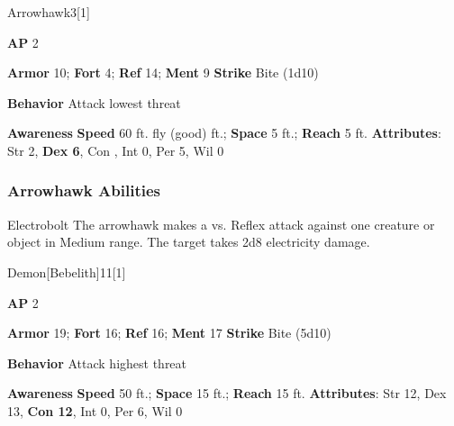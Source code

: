 \begin{monsection}{Arrowhawk}{3}[1]
\vspace{-1em}\vspace{-1em}
\begin{spellcontent}
\begin{spelltargetinginfo}
{\textbf{AP} 2}

\pari \textbf{Armor} 10;
\textbf{Fort} 4;
\textbf{Ref} 14;
\textbf{Ment} 9
\pari \textbf{Strike} Bite  (1d10)



\pari \textbf{Behavior} Attack lowest threat
\end{spelltargetinginfo}
\end{spellcontent}

\begin{monsterfooter}
\pari \textbf{Awareness} 
\pari \textbf{Speed} 60 ft. fly (good) ft.;
\textbf{Space} 5 ft.;
\textbf{Reach} 5 ft.
\pari \textbf{Attributes}:
Str 2,
\textbf{Dex 6},
Con ,
Int 0,
Per 5,
Wil 0
\end{monsterfooter}
\end{monsection}


\subsubsection{Arrowhawk Abilities}

\begin{ability}{Electrobolt}
The arrowhawk makes a  vs. Reflex attack against one creature or object in Medium range.
\hit The target takes 2d8 electricity damage.
\end{ability}

\begin{monsection}{Demon}[Bebelith]{11}[1]
\vspace{-1em}\vspace{-1em}
\begin{spellcontent}
\begin{spelltargetinginfo}
{\textbf{AP} 2}

\pari \textbf{Armor} 19;
\textbf{Fort} 16;
\textbf{Ref} 16;
\textbf{Ment} 17
\pari \textbf{Strike} Bite  (5d10)



\pari \textbf{Behavior} Attack highest threat
\end{spelltargetinginfo}
\end{spellcontent}

\begin{monsterfooter}
\pari \textbf{Awareness} 
\pari \textbf{Speed} 50 ft.;
\textbf{Space} 15 ft.;
\textbf{Reach} 15 ft.
\pari \textbf{Attributes}:
Str 12,
Dex 13,
\textbf{Con 12},
Int 0,
Per 6,
Wil 0
\end{monsterfooter}
\end{monsection}


